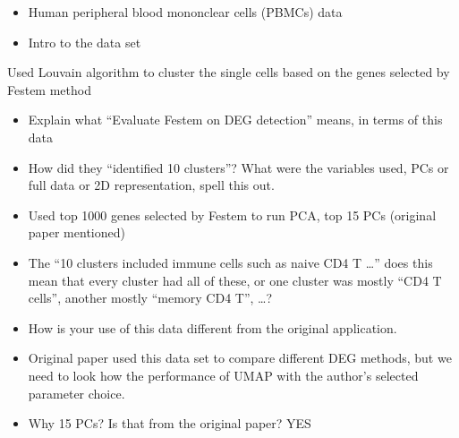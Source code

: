 \documentclass[
  12pt]{article}
\begin{document}
\begin{itemize}
\item
  Human peripheral blood mononclear cells (PBMCs) data
\item
  Intro to the data set
\end{itemize}

Used Louvain algorithm to cluster the single cells based on the genes
selected by Festem method

\begin{itemize}
\item
  Explain what ``Evaluate Festem on DEG detection'' means, in terms of
  this data
\item
  How did they ``identified 10 clusters''? What were the variables used,
  PCs or full data or 2D representation, spell this out.
\item
  Used top 1000 genes selected by Festem to run PCA, top 15 PCs
  (original paper mentioned)
\item
  The ``10 clusters included immune cells such as naive CD4 T \ldots{}''
  does this mean that every cluster had all of these, or one cluster was
  mostly ``CD4 T cells'', another mostly ``memory CD4 T'', \ldots?
\item
  How is your use of this data different from the original application.
\item
  Original paper used this data set to compare different DEG methods,
  but we need to look how the performance of UMAP with the author's
  selected parameter choice.
\item
  Why 15 PCs? Is that from the original paper? YES
\end{itemize}

\citet{Chen2023}
\end{document}
